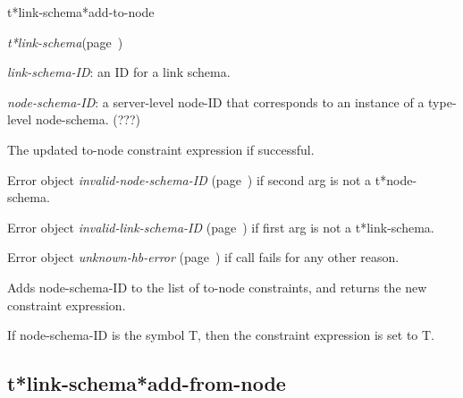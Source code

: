 \begin{description}
\item [Name:]  t*link-schema*add-to-node

\item [Class:] {\sl t*link-schema}\hfill(page~\pageref{t*link-schema})

\item [Parameters:]
\item {\sl link-schema-ID}:  an ID for a link schema.

\item {\sl node-schema-ID}:  a server-level node-ID that corresponds to an 
instance of a type-level node-schema. (???)



\item [Return-value:]
The updated to-node constraint expression if successful.

Error object {\sl invalid-node-schema-ID} (page~\pageref{invalid-node-schema-ID}) if second
arg is not a t*node-schema.

Error object {\sl invalid-link-schema-ID} (page~\pageref{invalid-link-schema-ID}) if first
arg is not a t*link-schema.

Error object {\sl unknown-hb-error} (page~\pageref{unknown-hb-error}) if call fails for 
any other reason.

\item [Description:]

Adds node-schema-ID to the list of to-node constraints,
and returns the new constraint expression.

If node-schema-ID is the symbol T, then the constraint
expression is set to T.

\item [Public:]



\end{description}
\horizontalline

\subsection{t*link-schema*add-from-node}
\label{t*link-schema*add-from-node}

